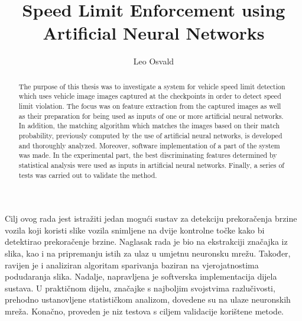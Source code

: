 \documentclass[times, utf8, zavrsni]{fer}
\begin{document}

\title{Speed Limit Enforcement using Artificial Neural Networks}

\author{Leo Osvald}

\maketitle%

\zahvala{}

\begin{sazetak}
Cilj ovog rada jest istražiti jedan mogući sustav za detekciju prekoračenja
brzine vozila koji koristi slike vozila snimljene na dvije kontrolne točke kako bi
detektirao prekoračenje brzine. Naglasak rada je bio na ekstrakciji značajka iz
slika, kao i na pripremanju istih za ulaz u umjetnu neuronsku mrežu. Također,
ravijen je i analiziran algoritam sparivanja baziran na vjerojatnostima
podudaranja slika. Nadalje, napravljena je softverska implementacija dijela
sustava. U praktičnom dijelu, značajke s najboljim svojstvima razlučivosti, prehodno ustanovljene
statističkom analizom, dovedene su na ulaze neuronskih mreža. Konačno, proveden
je niz testova s ciljem validacije korištene metode.

\end{sazetak}
\begin{abstract}

The purpose of this thesis was to investigate a system for vehicle speed limit
detection which uses vehicle image images captured at the checkpoints in order
to detect speed limit violation. The focus was on feature extraction from the
captured images as well as their preparation for being used as inputs of one or
more artificial neural networks. In addition, the matching algorithm which
matches the images based on their match probability, previously computed by the
use of artificial neural networks, is developed and thoroughly analyzed.
Moreover, software implementation of a part of the system was made. In the
experimental part, the best discriminating features determined by statistical
analysis were used as inputs in artificial neural networks. Finally, a
series of tests was carried out to validate the method.

\end{abstract}
\end{document}
